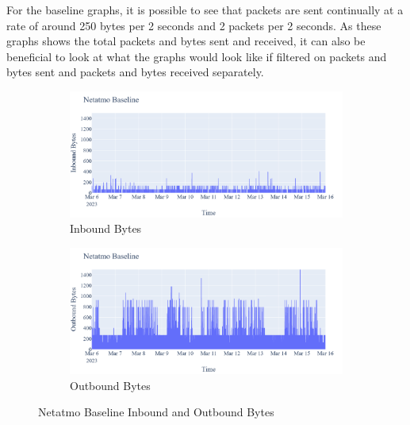 For the baseline graphs, it is possible to see that packets are sent continually at a rate of around 250 bytes per 2 seconds and 2 packets per 2 seconds. As these graphs shows the total packets and bytes sent and received, it can also be beneficial to look at what the graphs would look like if filtered on packets and bytes sent and packets and bytes received separately. 

\begin{figure}[H]
    \centering
    \begin{subfigure}[b]{0.7\textwidth}
        \includegraphics[width=\textwidth]{figures/Netatmo_Baseline_InboundBytes.png}
        \caption{Inbound Bytes}
        \label{fig:NetatmoBaselineInboundBytes}
    \end{subfigure}
    \begin{subfigure}[b]{0.7\textwidth}
        \includegraphics[width=\textwidth]{figures/Netatmo_Baseline_OutboundBytes.png}
        \caption{Outbound Bytes}
        \label{fig:NetatmoBaselineOutboundBytes}
    \end{subfigure}
    \caption{Netatmo Baseline Inbound and Outbound Bytes}
    \label{Fig:NetatmoBaselineOutandInboundBytes}
 \end{figure}

